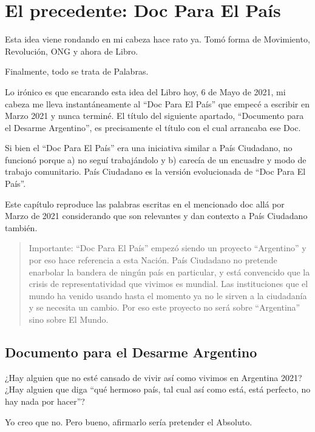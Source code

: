 \documentclass[
]{book}
\begin{document}
\hypertarget{el-precedente-doc-para-el-pauxeds}{%
\chapter{El precedente: Doc Para El País}\label{el-precedente-doc-para-el-pauxeds}}

Esta idea viene rondando en mi cabeza hace rato ya. Tomó forma de Movimiento, Revolución, ONG y ahora de Libro.

Finalmente, todo se trata de Palabras.

Lo irónico es que encarando esta idea del Libro hoy, 6 de Mayo de 2021, mi cabeza me lleva instantáneamente al ``Doc Para El País'' que empecé a escribir en Marzo 2021 y nunca terminé. El título del siguiente apartado, ``Documento para el Desarme Argentino'', es precisamente el título con el cual arrancaba ese Doc.

Si bien el ``Doc Para El País'' era una iniciativa similar a País Ciudadano, no funcionó porque a) no seguí trabajándolo y b) carecía de un encuadre y modo de trabajo comunitario. País Ciudadano es la versión evolucionada de ``Doc Para El País''.

Este capítulo reproduce las palabras escritas en el mencionado doc allá por Marzo de 2021 considerando que son relevantes y dan contexto a País Ciudadano también.

\begin{quote}
Importante: ``Doc Para El País'' empezó siendo un proyecto ``Argentino'' y por eso hace referencia a esta Nación. País Ciudadano no pretende enarbolar la bandera de ningún país en particular, y está convencido que la crisis de representatividad que vivimos es mundial. Las instituciones que el mundo ha venido usando hasta el momento ya no le sirven a la ciudadanía y se necesita un cambio. Por eso este proyecto no será sobre ``Argentina'' sino sobre El Mundo.
\end{quote}

\hypertarget{documento-para-el-desarme-argentino}{%
\section{Documento para el Desarme Argentino}\label{documento-para-el-desarme-argentino}}

¿Hay alguien que no esté cansado de vivir así como vivimos en Argentina 2021? ¿Hay alguien que diga ``qué hermoso país, tal cual así como está, está perfecto, no hay nada por hacer''?

Yo creo que no. Pero bueno, afirmarlo sería pretender el Absoluto.
\end{document}
